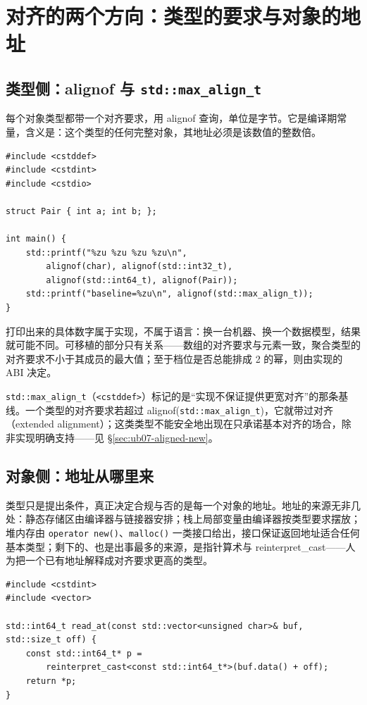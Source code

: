 \documentclass[12pt,a4paper,fontset=fandol]{ctexbook}
\newcommand{\Fn}[1]{\texttt{#1()}}
\newcommand{\Tp}[1]{\texttt{#1}}
\newcommand{\Lang}[1]{\textsf{#1}}
\newcommand{\Hdr}[1]{\texttt{<#1>}}
\begin{document}
\section{对齐的两个方向：类型的要求与对象的地址}\label{sec:ub07-two-directions}

\subsection{类型侧：\Lang{alignof} 与 \Tp{std::max\_align\_t}}\label{sec:ub07-type-side}

每个对象类型都带一个对齐要求，用 \Lang{alignof} 查询，单位是字节。它是编译期常量，含义是：这个类型的任何完整对象，其地址必须是该数值的整数倍。

\begin{lstlisting}[style=cppstyle,caption={类型侧的对齐要求是编译期常量，数值本身属于实现}]
#include <cstddef>
#include <cstdint>
#include <cstdio>

struct Pair { int a; int b; };

int main() {
    std::printf("%zu %zu %zu %zu\n",
        alignof(char), alignof(std::int32_t),
        alignof(std::int64_t), alignof(Pair));
    std::printf("baseline=%zu\n", alignof(std::max_align_t));
}
\end{lstlisting}

打印出来的具体数字属于实现，不属于语言：换一台机器、换一个数据模型，结果就可能不同。可移植的部分只有关系——数组的对齐要求与元素一致，聚合类型的对齐要求不小于其成员的最大值；至于档位是否总能排成 2 的幂，则由实现的 ABI 决定。

\Tp{std::max\_align\_t}（\Hdr{cstddef}）标记的是“实现不保证提供更宽对齐”的那条基线。一个类型的对齐要求若超过 \Lang{alignof}(\Tp{std::max\_align\_t})，它就带过对齐（extended alignment）；这类类型不能安全地出现在只承诺基本对齐的场合，除非实现明确支持——见 §\ref{sec:ub07-aligned-new}。

\subsection{对象侧：地址从哪里来}\label{sec:ub07-object-side}

类型只是提出条件，真正决定合规与否的是每一个对象的地址。地址的来源无非几处：静态存储区由编译器与链接器安排；栈上局部变量由编译器按类型要求摆放；堆内存由 \Fn{operator new}、\Fn{malloc} 一类接口给出，接口保证返回地址适合任何基本类型；剩下的、也是出事最多的来源，是指针算术与 \Lang{reinterpret\_cast}——人为把一个已有地址解释成对齐要求更高的类型。

\begin{lstlisting}[style=cppstyle,caption={地址由算术产生时，没有任何机制保证它满足目标类型的要求}]
#include <cstdint>
#include <vector>

std::int64_t read_at(const std::vector<unsigned char>& buf, std::size_t off) {
    const std::int64_t* p =
        reinterpret_cast<const std::int64_t*>(buf.data() + off);
    return *p;
}
\end{lstlisting}
\end{document}
